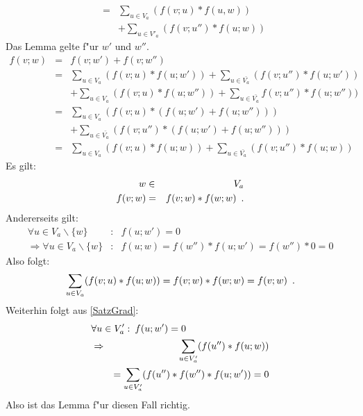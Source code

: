 \begin{beweis}
\begin{MyDescription}
\begin{eqnarray*}
            & = &
                \sum_{u \in V_a} (f(v;u) * f(u,w)) \\
              & & + \sum_{u \in V'_a} (f(v;u'') * f(u;w))
        \end{eqnarray*}
        Das Lemma gelte f"ur $w'$ und $w''$.
        \begin{eqnarray*}
            f(v;w) & = & f(v;w') + f(v;w'') \\
            & = &
                \sum_{u \in V_a} (f(v;u)*f(u;w')) +
                \sum_{u \in \bar{V_a}} (f(v;u'')*f(u;w')) \\
            & & + \sum_{u \in V_a} (f(v;u)*f(u;w'')) +
                  \sum_{u \in \bar{V_a}} f(v;u'')*f(u;w'')) \\
            & = &
                \sum_{u \in V_a} (f(v;u) * (f(u;w') + f(u;w''))) \\
            & & + \sum_{u \in \bar{V_a}} (f(v;u'')*(f(u;w') + f(u;w''))) \\
            & = &
                \sum_{u \in V_a} (f(v;u) * f(u;w)) +
                \sum_{u \in \bar{V_a}} (f(v;u'') * f(u;w))
        \end{eqnarray*}
        Es gilt: 
        \begin{eqnarray*}
            w & \in & V_a \\
            f(v;w) & = & f(v;w) * f(w;w) \mbox{\hspace{0.5em}.}
        \end{eqnarray*}
        Andererseits gilt:
        \begin{eqnarray*}
            \forall u \in V_a \backslash \{w\} & : & f(u;w') = 0 \\
            \Rightarrow
            \forall u \in V_a \backslash \{w\} & : &
                f(u;w) = f(w'') * f(u;w') = f(w'') * 0 = 0
        \end{eqnarray*}
        Also folgt:
        \[ \sum_{u \in V_a} (f(v;u) * f(u;w)) = f(v;w) * f(w;w) = f(v;w)
           \mbox{\hspace{0.5em}.}
        \]
        Weiterhin folgt aus \ref{SatzGrad}:
        \begin{eqnarray*}
            \lefteqn{ \forall u \in V'_a : \: f(u;w') = 0 } \\
            & \Rightarrow &
               \sum_{u \in V'_a} (f(u'') * f(u;w)) \\
            & & = \sum_{u \in V'_a} (f(u'') * f(w'') * f(u;w')) = 0
        \end{eqnarray*}
        Also ist das Lemma f"ur diesen Fall richtig.    

\end{MyDescription}
\end{beweis}
